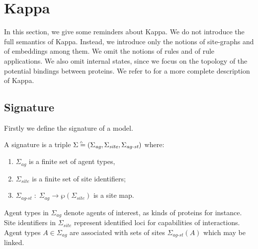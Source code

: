 \documentclass{entcs}
\newcommand{\agentname}{\signaturesymb_{\textit{ag}}}
\newcommand{\sitename}{\signaturesymb_{\textit{site}}}
\newcommand{\linksite}{\signaturesymb_{\textit{ag-st}}}
\newcommand{\signaturesymb}{\Sigma}
\newcommand{\signaturetuple}{(\agentname,\sitename,\linksite)}
\newcommand{\bydef}{\stackrel{\scalebox{0.8}{\!\!$\scriptscriptstyle{\triangle}$}}{=}}
\begin{document}
\section{Kappa}

\label{sec:kappa}

In this section, we give some reminders about Kappa.
We do not introduce the full semantics of Kappa. Instead, we introduce only the notions of site-graphs and of embeddings among them. We omit the notions of rules and of rule applications. We also omit internal states, since we focus on the topology of the potential bindings between proteins.   We refer to \cite{DBLP:journals/tcs/DanosL04,Feret_IJSI2013} for a more complete description of Kappa.

\subsection{Signature}

Firstly we define the signature of a model.
\begin{defn}[signature]
\label{def:signature}
A signature is a triple $\signaturesymb\bydef\signaturetuple$ where: \begin{enumerate}\item $\agentname$ is a finite set of agent types, \item $\sitename$ is a finite set of site identifiers; \item $\linksite\;:\;\agentname \rightarrow \wp(\sitename)$ is a site map.
\end{enumerate}\end{defn}


Agent types in $\agentname$ denote agents of interest, as kinds of proteins  for instance.
Site identifiers in $\sitename$ represent identified loci for capabilities of interactions.
Agent types $A\in\agentname$ are associated with sets of sites $\linksite(A)$ which may be linked.
\end{document}
